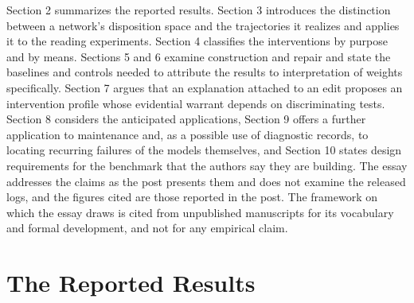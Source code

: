 \documentclass[11pt]{article}
\begin{document}
Section 2 summarizes the reported results. Section 3 introduces the distinction between a network's disposition space and the trajectories it realizes and applies it to the reading experiments. Section 4 classifies the interventions by purpose and by means. Sections 5 and 6 examine construction and repair and state the baselines and controls needed to attribute the results to interpretation of weights specifically. Section 7 argues that an explanation attached to an edit proposes an intervention profile whose evidential warrant depends on discriminating tests. Section 8 considers the anticipated applications, Section 9 offers a further application to maintenance and, as a possible use of diagnostic records, to locating recurring failures of the models themselves, and Section 10 states design requirements for the benchmark that the authors say they are building. The essay addresses the claims as the post presents them and does not examine the released logs, and the figures cited are those reported in the post. The framework on which the essay draws is cited from unpublished manuscripts for its vocabulary and formal development, and not for any empirical claim.

\section{The Reported Results}
\end{document}
